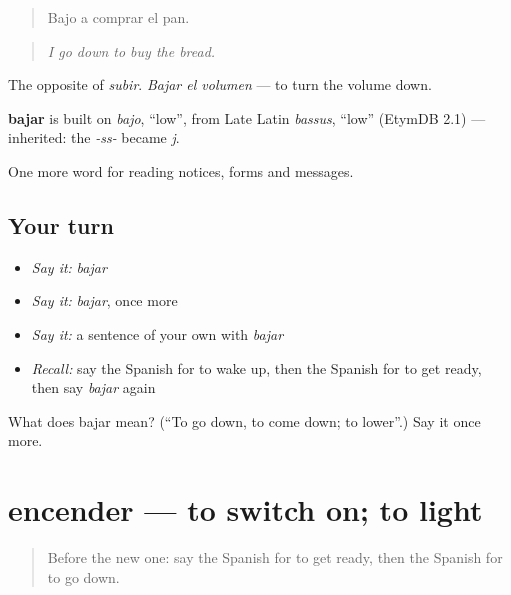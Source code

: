 \begin{quote}
Bajo a comprar el pan.
\end{quote}

\begin{quote}
\emph{I go down to buy the bread.}
\end{quote}

The opposite of \emph{subir}. \emph{Bajar el volumen} — to turn the volume down.

\begin{cousinweb}
\textbf{bajar} is built on \emph{bajo}, \textquotedblleft{}low\textquotedblright{}, from Late Latin \emph{bassus}, \textquotedblleft{}low\textquotedblright{} (EtymDB 2.1) — inherited: the \emph{-ss-} became \emph{j}.
\end{cousinweb}

\begin{grammarlens}[title={What you've built}]
One more word for reading notices, forms and messages.
\end{grammarlens}

\subsection*{Your turn}
\begin{itemize}
\raggedright
  \item \emph{Say it:} \emph{bajar}
  \item \emph{Say it:} \emph{bajar}, once more
  \item \emph{Say it:} a sentence of your own with \emph{bajar}
  \item \emph{Recall:} say the Spanish for to wake up, then the Spanish for to get ready, then say \emph{bajar} again
\end{itemize}

\begin{tcolorbox}[breakable,colback=teal!4,colframe=teal!35!black,title={Before you move on}]
What does bajar mean? (\textquotedblleft{}To go down, to come down; to lower\textquotedblright{}.) Say it once more.
\end{tcolorbox}
\section[encender]{encender — to switch on; to light}

\label{lesson:ES-C494-encender}



\begin{quote}
Before the new one: say the Spanish for to get ready, then the Spanish for to go down.
\end{quote}

